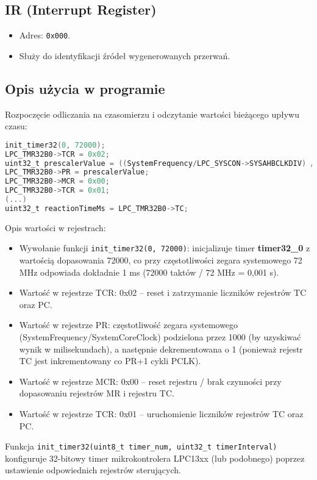 \documentclass[a4paper,12pt]{report}
\begin{document}
\subsection{IR (Interrupt Register)}
\begin{itemize}
    \item Adres: \texttt{0x000}.
    \item Służy do identyfikacji źródeł wygenerowanych przerwań.
\end{itemize}

\subsection{Opis użycia w programie}
Rozpoczęcie odliczania na czasomierzu i odczytanie wartości bieżącego upływu czasu:
\begin{lstlisting}[language=C]
init_timer32(0, 72000);
LPC_TMR32B0->TCR = 0x02;
uint32_t prescalerValue = ((SystemFrequency/LPC_SYSCON->SYSAHBCLKDIV) / 1000) - 1;
LPC_TMR32B0->PR = prescalerValue;
LPC_TMR32B0->MCR = 0x00;
LPC_TMR32B0->TCR = 0x01;
(...)
uint32_t reactionTimeMs = LPC_TMR32B0->TC;
\end{lstlisting}

Opis wartości w rejestrach:
\begin{itemize}
    \item Wywołanie funkcji \texttt{init\_timer32(0, 72000)}: inicjalizuje timer \textbf{timer32\_0} z wartością dopasowania 72000, co przy częstotliwości zegara systemowego 72 MHz odpowiada dokładnie 1 ms (72000 taktów / 72 MHz = 0{,}001 s).
    \item Wartość w rejestrze TCR: 0x02 – reset i zatrzymanie liczników rejestrów TC oraz PC.
    \item Wartość w rejestrze PR: częstotliwość zegara systemowego (SystemFrequency/SystemCoreClock) podzielona przez 1000 (by uzyskiwać wynik w milisekundach), a następnie dekrementowana o 1 (ponieważ rejestr TC jest inkrementowany co PR+1 cykli PCLK).
    \item Wartość w rejestrze MCR: 0x00 – reset rejestru / brak czynności przy dopasowaniu rejestrów MR i rejestru TC.
    \item Wartość w rejestrze TCR: 0x01 – uruchomienie liczników rejestrów TC oraz PC.
\end{itemize}
\vspace{15pt}

Funkcja \texttt{init\_timer32(uint8\_t timer\_num, uint32\_t timerInterval)} konfiguruje 32-bitowy timer mikrokontrolera LPC13xx (lub podobnego) poprzez ustawienie odpowiednich rejestrów sterujących.
\end{document}
